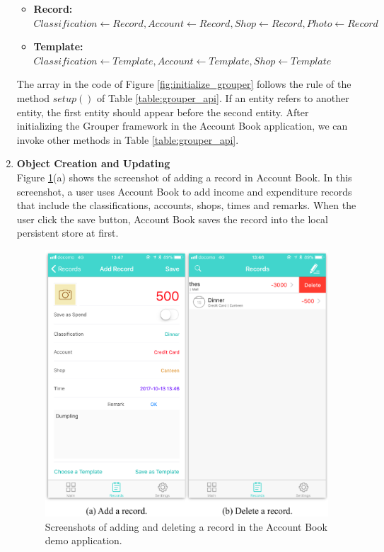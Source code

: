 \documentclass[a4paper,11pt]{report}
\begin{document}
\begin{enumerate}
\begin{itemize}
	\setlength{\itemsep}{1pt}
	\setlength{\parskip}{0pt}
	\setlength{\parsep}{0pt}
	\item \textbf{Record:}
	$Classification \gets Record, Account \gets Record, Shop \gets Record, Photo \gets Record$
	\item \textbf{Template:} 
	$Classification \gets Template, Account \gets Template, Shop \gets Template$
\end{itemize}

The array in the code of Figure \ref{fig:initialize_grouper} follows the rule of the method $setup()$ of Table \ref{table:grouper_api}.
If an entity refers to another entity, the first entity should appear before the second entity.
After initializing the Grouper framework in the Account Book application, we can invoke other methods in Table \ref{table:grouper_api}.
\\

\item \textbf{Object Creation and Updating} \\	

Figure \ref{fig:add_delete_record}(a) shows the screenshot of adding a record in Account Book. 
In this screenshot, a user uses Account Book to add income and expenditure records that include the classifications, accounts, shops, times and remarks. 
When the user click the save button, Account Book saves the record into the local persistent store at first.

\begin{figure}[t]
	\centering
	\includegraphics[scale=0.7]{account_book}
	\caption{Screenshots of adding and deleting a record in the Account Book demo application.}
	\label{fig:add_delete_record}
\end{figure}


\end{enumerate}
\end{document}
